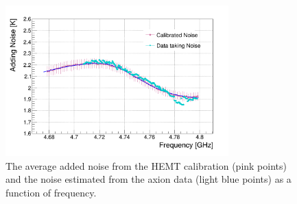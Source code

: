 \begin{figure} [htbp]
  \centering
  \includegraphics[width=8.6cm]{figures/Avg_Noise_vs_Freq_run1to19_211118.png}
  \caption{The average added noise from the HEMT calibration (pink points) and 
 the noise estimated from the axion data (light blue points) as a function of frequency.}
  \label{fig:hemtcalvsf}
\end{figure}


  

